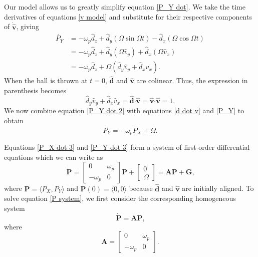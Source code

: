 \documentclass{article}
\begin{document}
Our model allows us to greatly simplify equation \ref{P_Y dot}. We take the time derivatives of equations \ref{v model} and substitute for their respective components of $\mathbf{\dot{\hat{v}}}$, giving
\begin{equation}\label{P_Y dot 2}
    \begin{split}
        \dot{P_Y} &= -\omega_p\hat{d}_z + \hat{d}_y(\Omega\sin{\Omega t}) - \hat{d}_x(\Omega\cos{\Omega t}) \\
        &= -\omega_p\hat{d}_z + \hat{d}_y(\Omega\hat{v}_y) + \hat{d}_x(\Omega\hat{v}_x) \\
        &= -\omega_p\hat{d}_z + \Omega(\hat{d}_y\hat{v}_y + \hat{d}_x\hat{v}_x)\text{.}
    \end{split}
\end{equation}
When the ball is thrown at $t=0$, $\mathbf{\hat{d}}$ and $\mathbf{\hat{v}}$ are colinear. Thus, the expression in parenthesis becomes
\begin{equation}\label{d dot v}
    \hat{d}_y\hat{v}_y + \hat{d}_x\hat{v}_x = \mathbf{\hat{d}} \boldsymbol{\cdot} \mathbf{\hat{v}} = \mathbf{\hat{v}} \boldsymbol{\cdot} \mathbf{\hat{v}} = 1\text{.}
\end{equation}
We now combine equation \ref{P_Y dot 2} with equations \ref{d dot v} and \ref{P_Y} to obtain
\begin{equation}\label{P_Y dot 3}
    \dot{P_Y} = -\omega_pP_X + \Omega\text{.}
\end{equation}

Equations \ref{P_X dot 3} and \ref{P_Y dot 3} form a system of first-order differential equations which we can write as
\begin{equation}\label{P system}
    \mathbf{\dot{P}} = 
    \begin{bmatrix}
        0 & \omega_p \\
        -\omega_p & 0
    \end{bmatrix}\mathbf{P} +
    \begin{bmatrix}
        0 \\ \Omega
    \end{bmatrix} = 
    \mathbf{AP} + \mathbf{G}\text{,}
\end{equation}
where $\mathbf{P} = \langle P_X, P_Y \rangle$ and $\mathbf{P}(0) = \langle 0, 0 \rangle$ because $\mathbf{\hat{d}}$ and $\mathbf{\hat{v}}$ are initially aligned.
To solve equation \ref{P system}, we first consider the corresponding homogeneous system 
\begin{equation}\label{P system homo}
    \mathbf{\dot{P}} = \mathbf{AP}\text{,}
\end{equation}
where $$\mathbf{A} = 
\begin{bmatrix}
    0 & \omega_p \\
    -\omega_p & 0
\end{bmatrix}\text{.}$$
\end{document}
